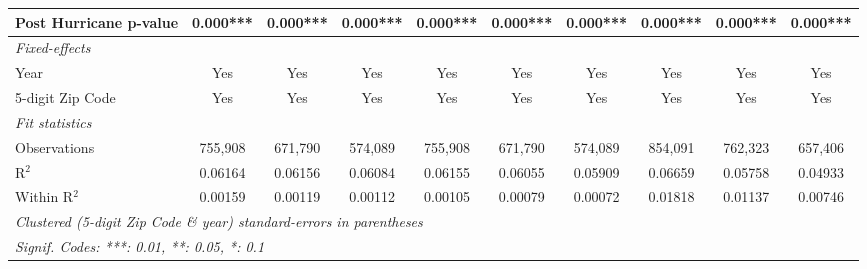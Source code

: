 \begin{tabular}{lccccccccc}
   Post Hurricane p-value                                     & 0.000***       & 0.000***       & 0.000***             & 0.000***       & 0.000***       & 0.000***       & 0.000***       & 0.000***       & 0.000***\\  
   \midrule
   \emph{Fixed-effects}\\
   Year                                                       & Yes            & Yes            & Yes                  & Yes            & Yes            & Yes            & Yes            & Yes            & Yes\\  
   5-digit Zip Code                                           & Yes            & Yes            & Yes                  & Yes            & Yes            & Yes            & Yes            & Yes            & Yes\\  
   \midrule
   \emph{Fit statistics}\\
   Observations                                               & 755,908        & 671,790        & 574,089              & 755,908        & 671,790        & 574,089        & 854,091        & 762,323        & 657,406\\  
   R$^2$                                                      & 0.06164        & 0.06156        & 0.06084              & 0.06155        & 0.06055        & 0.05909        & 0.06659        & 0.05758        & 0.04933\\  
   Within R$^2$                                               & 0.00159        & 0.00119        & 0.00112              & 0.00105        & 0.00079        & 0.00072        & 0.01818        & 0.01137        & 0.00746\\  
   \midrule \midrule
   \multicolumn{10}{l}{\emph{Clustered (5-digit Zip Code \& year) standard-errors in parentheses}}\\
   \multicolumn{10}{l}{\emph{Signif. Codes: ***: 0.01, **: 0.05, *: 0.1}}\\
\end{tabular}
\par\endgroup
